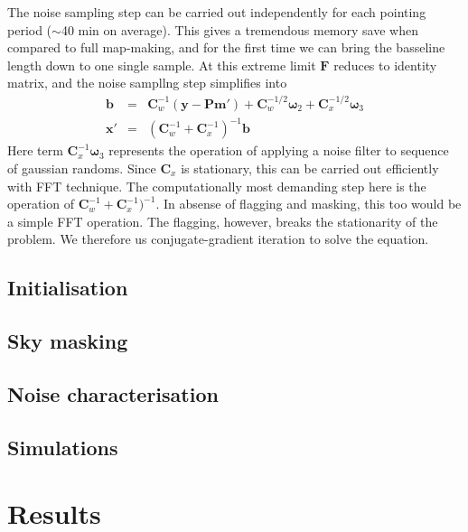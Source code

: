 \documentclass[traditabstract]{aa}
\newcommand{\ve}[1]{{\mathbf #1}}
\newcommand{\ma}[1]{\mathbf{#1}}
\begin{document}
The noise sampling step can be carried out independently for each pointing period ($\sim$40 min on average).
This gives a tremendous memory save when compared to full map-making,
and for the first time we can bring the basseline length down to one single sample.
At this extreme limit $\ma F$ reduces to identity matrix, and the noise sampllng step simplifies into
%
\begin{eqnarray}
\ve b &=&  \ma C_w^{-1} (\ve y -\ma P\ve m')
        +\ma C_w^{-1/2}\ve\omega_2 
        +\ma C_x^{-1/2}\ve\omega_3   \nonumber \\
\ve x' &=& (\ma C_w^{-1} +\ma C_x^{-1})^{-1} \ve b \label{gibbs3}
\end{eqnarray}
%
Here term $\ma C_x^{-1}\ve\omega_3$ represents the operation
of applying a noise filter to sequence of gaussian randoms.
Since $\ma C_x$ is stationary, this can be carried out efficiently with FFT technique.
The computationally most demanding step here is the operation
of $\ma C_w^{-1} +\ma C_x^{-1})^{-1} $.
In absense of flagging and masking, this too would be
a simple FFT operation. The flagging, however, breaks
the stationarity of the problem.
We therefore us conjugate-gradient iteration to solve the equation.

\subsection{Initialisation}


\subsection{Sky masking}


\subsection{Noise characterisation}


\subsection{Simulations}


\section{Results}
\end{document}
